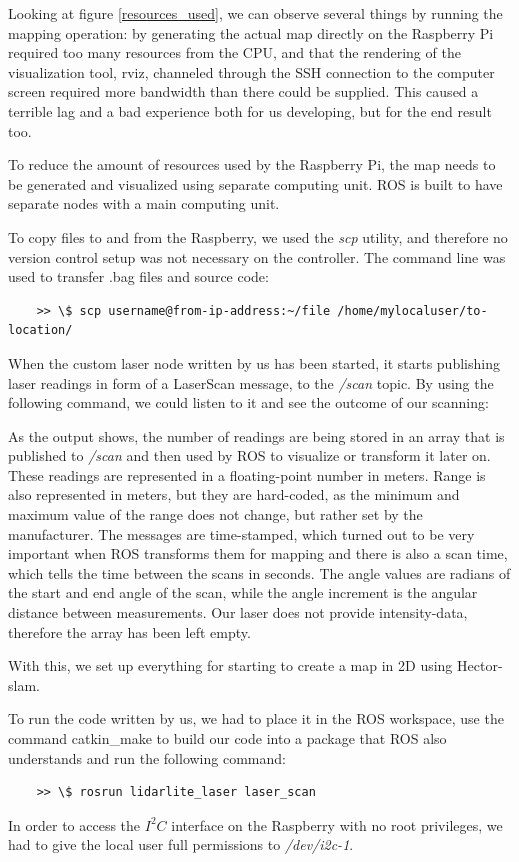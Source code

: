Looking at figure \ref{resources_used}, we can observe several things by running the mapping operation: by generating the actual map directly on the Raspberry Pi required too many resources from the CPU, and that the rendering of the visualization tool, rviz, channeled through the SSH connection to the computer screen required more bandwidth than there could be supplied. This caused a terrible lag and a bad experience both for us developing, but for the end result too.

To reduce the amount of resources used by the Raspberry Pi, the map needs to be generated and visualized using separate computing unit. ROS is built to have separate nodes with a main computing unit.

To copy files to and from the Raspberry, we used the \textit{scp} utility, and therefore no version control setup was not necessary on the controller. The command line was used to transfer .bag files and source code:
\begin{lstlisting}
	>> \$ scp username@from-ip-address:~/file /home/mylocaluser/to-location/
\end{lstlisting}
When the custom laser node written by us has been started, it starts publishing laser readings in form of a LaserScan message, to the \textit{/scan} topic. By using the following command, we could listen to it and see the outcome of our scanning:



As the output shows, the number of readings are being stored in an array that is published to \textit{/scan} and then used by ROS to visualize or transform it later on. These readings are represented in a floating-point number in meters. Range is also represented in meters, but they are hard-coded, as the minimum and maximum value of the range does not change, but rather set by the manufacturer. The messages are time-stamped, which turned out to be very important when ROS transforms them for mapping and there is also a scan time, which tells the time between the scans in seconds. The angle values are radians of the start and end angle of the scan, while the angle increment is the angular distance between measurements. Our laser does not provide intensity-data, therefore the array has been left empty.

With this, we set up everything for starting to create a map in 2D using Hector-slam.

To run the code written by us, we had to place it in the ROS workspace, use the command catkin\_make to build our code into a package that ROS also understands and run the following command:

\begin{lstlisting}
	>> \$ rosrun lidarlite_laser laser_scan
\end{lstlisting}
In order to access the $I^2C$ interface on the Raspberry with no root privileges, we had to give the local user full permissions to \textit{/dev/i2c-1}.
